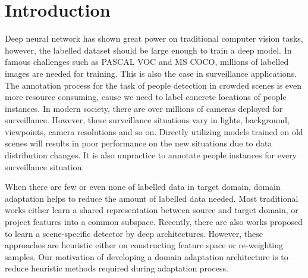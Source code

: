 \documentclass[runningheads]{llncs}
\begin{document}
\section{Introduction}

Deep neural network has shown great power on traditional computer vision tasks, however, the labelled dataset should be large enough to train a deep model. In famous challenges such as PASCAL VOC and MS COCO, millions of labelled images are needed for training. This is also the case in surveillance applications. The annotation process for the task of people detection in crowded scenes is even more resource consuming, cause we need to label concrete locations of people instances. In modern society, there are over millions of cameras deployed for surveillance. However, these surveillance situations vary in lights, background, viewpoints, camera resolutions and so on. Directly utilizing models trained on old scenes will results in poor performance on the new situations due to data distribution changes. It is also unpractice to annotate people instances for every surveillance situation.

When there are few or even none of labelled data in target domain, domain adaptation helps to reduce the amount of labelled data needed. Most traditional works \cite{saenko2010adapting,kulis2011you,gopalan2011domain,huang2006correcting,gretton2009covariate} either learn a shared representation between source and target domain, or project features into a common subspace. Recently, there are also works \cite{wang2014scene,zeng2014deep,hattori2015learning} proposed to learn a scene-specific detector by deep architectures. However, these approaches are heuristic either on constructing feature space or re-weighting samples. Our motivation of developing a domain adaptation architecture is to reduce heuristic methods required during adaptation process.
\end{document}
